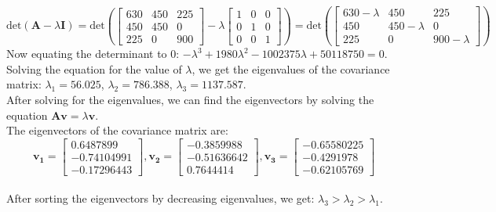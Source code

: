 \documentclass{book}
\begin{document}
\[
    \text{det}(\mathbf{A} - \lambda \mathbf{I}) = \text{det}(\begin{bmatrix}
        630 & 450 & 225\\
        450 & 450 & 0\\
        225 & 0 & 900
    \end{bmatrix}
    - \lambda \begin{bmatrix}
        1 & 0 & 0\\
        0 & 1 & 0\\
        0 & 0 & 1
    \end{bmatrix})
    = \text{det}(\begin{bmatrix}
        630-\lambda & 450 & 225\\
        450 & 450-\lambda & 0\\
        225 & 0 & 900-\lambda
    \end{bmatrix})
\]
Now equating the determinant to 0: \(-\lambda^3 + 1980\lambda^2 - 1002375\lambda + 50118750 = 0\).\\
Solving the equation for the value of \(\lambda\), we get the eigenvalues of the covariance matrix: \( \lambda_1 = 56.025\), \( \lambda_2 = 786.388\), \( \lambda_3 = 1137.587\).\\
\vspace{2mm}
After solving for the eigenvalues, we can find the eigenvectors by solving the equation \(\mathbf{Av} = \lambda \mathbf{v}\).\\
The eigenvectors of the covariance matrix are:
\[
    \mathbf{v_1} = \begin{bmatrix}
        0.6487899\\
        -0.74104991\\
        -0.17296443
    \end{bmatrix}, \mathbf{v_2} = \begin{bmatrix}
        -0.3859988\\
        -0.51636642\\
        0.7644414
    \end{bmatrix}, \mathbf{v_3} = \begin{bmatrix}
        -0.65580225\\
        -0.4291978\\
        -0.62105769
    \end{bmatrix}
\]
\\
After sorting the eigenvectors by decreasing eigenvalues, we get: \(\lambda_3 > \lambda_2 > \lambda_1\).\\
\end{document}
